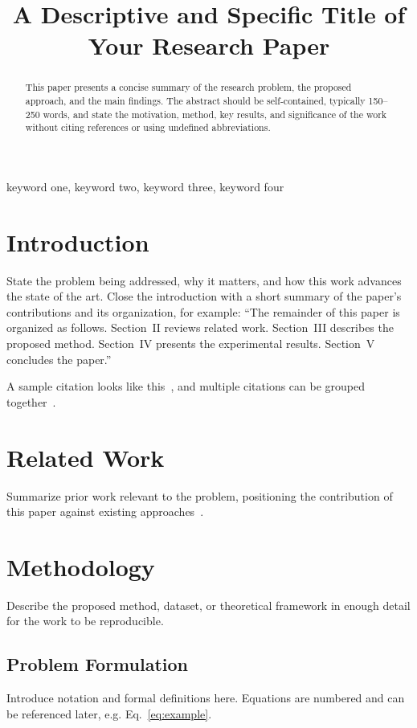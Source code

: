 \documentclass{intlpaper}
\title{A Descriptive and Specific Title of Your Research Paper}
\begin{document}
\maketitle

\begin{abstract}
This paper presents a concise summary of the research problem, the proposed
approach, and the main findings. The abstract should be self-contained,
typically 150--250 words, and state the motivation, method, key results, and
significance of the work without citing references or using undefined
abbreviations.
\end{abstract}

\begin{keywords}
keyword one, keyword two, keyword three, keyword four
\end{keywords}

\section{Introduction}
State the problem being addressed, why it matters, and how this work
advances the state of the art. Close the introduction with a short summary
of the paper's contributions and its organization, for example: ``The
remainder of this paper is organized as follows. Section~II reviews related
work. Section~III describes the proposed method. Section~IV presents the
experimental results. Section~V concludes the paper.''

A sample citation looks like this~\cite{smith2023}, and multiple citations
can be grouped together~\cite{lee2022,brown2021}.

\section{Related Work}
Summarize prior work relevant to the problem, positioning the contribution
of this paper against existing approaches~\cite{lee2022}.

\section{Methodology}
Describe the proposed method, dataset, or theoretical framework in enough
detail for the work to be reproducible.

\subsection{Problem Formulation}
Introduce notation and formal definitions here. Equations are numbered and
can be referenced later, e.g. Eq.~\eqref{eq:example}.
\end{document}
